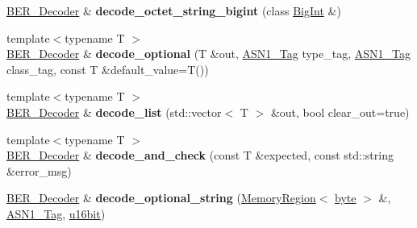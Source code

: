 \begin{DoxyCompactItemize}
\item 
\hypertarget{classBotan_1_1BER__Decoder_aa23412dc6b58dfb04a49daceeabfe135}{\hyperlink{classBotan_1_1BER__Decoder}{B\-E\-R\-\_\-\-Decoder} \& {\bfseries decode\-\_\-octet\-\_\-string\-\_\-bigint} (class \hyperlink{classBotan_1_1BigInt}{Big\-Int} \&)}\label{classBotan_1_1BER__Decoder_aa23412dc6b58dfb04a49daceeabfe135}

\item 
\hypertarget{classBotan_1_1BER__Decoder_a739f976c59b4497fd392f90fe1e4959c}{{\footnotesize template$<$typename T $>$ }\\\hyperlink{classBotan_1_1BER__Decoder}{B\-E\-R\-\_\-\-Decoder} \& {\bfseries decode\-\_\-optional} (T \&out, \hyperlink{namespaceBotan_aaa08f67a945ef195fa39e62659dffa7a}{A\-S\-N1\-\_\-\-Tag} type\-\_\-tag, \hyperlink{namespaceBotan_aaa08f67a945ef195fa39e62659dffa7a}{A\-S\-N1\-\_\-\-Tag} class\-\_\-tag, const T \&default\-\_\-value=T())}\label{classBotan_1_1BER__Decoder_a739f976c59b4497fd392f90fe1e4959c}

\item 
\hypertarget{classBotan_1_1BER__Decoder_a9cbd7c41134219fabc7878b946702b21}{{\footnotesize template$<$typename T $>$ }\\\hyperlink{classBotan_1_1BER__Decoder}{B\-E\-R\-\_\-\-Decoder} \& {\bfseries decode\-\_\-list} (std\-::vector$<$ T $>$ \&out, bool clear\-\_\-out=true)}\label{classBotan_1_1BER__Decoder_a9cbd7c41134219fabc7878b946702b21}

\item 
\hypertarget{classBotan_1_1BER__Decoder_af49a551ac158dc6ce87fca3768be1371}{{\footnotesize template$<$typename T $>$ }\\\hyperlink{classBotan_1_1BER__Decoder}{B\-E\-R\-\_\-\-Decoder} \& {\bfseries decode\-\_\-and\-\_\-check} (const T \&expected, const std\-::string \&error\-\_\-msg)}\label{classBotan_1_1BER__Decoder_af49a551ac158dc6ce87fca3768be1371}

\item 
\hypertarget{classBotan_1_1BER__Decoder_a66ce7ea9800f529dba12504f6a2349e6}{\hyperlink{classBotan_1_1BER__Decoder}{B\-E\-R\-\_\-\-Decoder} \& {\bfseries decode\-\_\-optional\-\_\-string} (\hyperlink{classBotan_1_1MemoryRegion}{Memory\-Region}$<$ \hyperlink{namespaceBotan_a7d793989d801281df48c6b19616b8b84}{byte} $>$ \&, \hyperlink{namespaceBotan_aaa08f67a945ef195fa39e62659dffa7a}{A\-S\-N1\-\_\-\-Tag}, \hyperlink{namespaceBotan_ab07face63a00c39ea6ed97f203ee501c}{u16bit})}\label{classBotan_1_1BER__Decoder_a66ce7ea9800f529dba12504f6a2349e6}


\end{DoxyCompactItemize}
